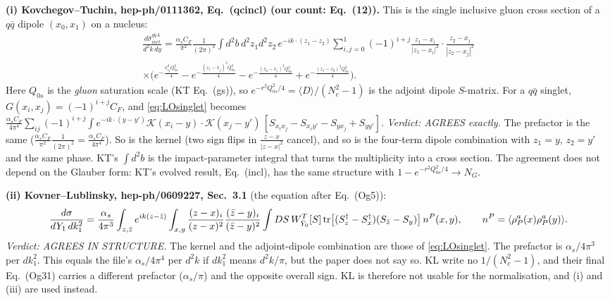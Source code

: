\medskip\noindent\textbf{(i) Kovchegov--Tuchin, hep-ph/0111362, Eq.~(qcincl) (our count: Eq.~(12)).} This is the single inclusive gluon cross section of a $q\bar q$ dipole $(x_0,x_1)$ on a nucleus:
\begin{multline*}
\frac{d\hat\sigma^{q\bar qA}_{incl}}{d^2k\,dy}=\frac{\alpha_sC_F}{\pi^2}\frac{1}{(2\pi)^2}\int d^2b\,d^2z_1d^2z_2\,e^{-ik\cdot(z_1-z_2)}\sum_{i,j=0}^{1}(-1)^{i+j}\frac{z_1-x_i}{|z_1-x_i|^2}\cdot\frac{z_2-x_j}{|z_2-x_j|^2}\\
\times\Big(e^{-\frac{x_{ij}^2Q_{0s}^2}{4}}-e^{-\frac{(z_1-x_j)^2Q_{0s}^2}{4}}-e^{-\frac{(z_2-x_i)^2Q_{0s}^2}{4}}+e^{-\frac{(z_1-z_2)^2Q_{0s}^2}{4}}\Big).
\end{multline*}
Here $Q_{0s}$ is the \emph{gluon} saturation scale (KT Eq.~(gs)), so $e^{-r^2Q_{0s}^2/4}=\langle D\rangle/(N_c^2-1)$ is the adjoint dipole $S$-matrix. For a $q\bar q$ singlet, $G(x_i,x_j)=(-1)^{i+j}C_F$, and \eqref{eq:LOsinglet} becomes
$\frac{\alpha_sC_F}{4\pi^4}\sum_{ij}(-1)^{i+j}\int e^{-ik\cdot(y-y')}\mathcal K(x_i-y)\cdot\mathcal K(x_j-y')\,[S_{x_ix_j}-S_{x_iy'}-S_{yx_j}+S_{yy'}]$.
\emph{Verdict: AGREES exactly.} The prefactor is the same ($\frac{\alpha_sC_F}{\pi^2}\frac{1}{(2\pi)^2}=\frac{\alpha_sC_F}{4\pi^4}$). So is the kernel (two sign flips in $\frac{z-x}{|z-x|^2}$ cancel), and so is the four-term dipole combination with $z_1=y$, $z_2=y'$ and the same phase. KT's $\int d^2b$ is the impact-parameter integral that turns the multiplicity into a cross section. The agreement does not depend on the Glauber form: KT's evolved result, Eq.~(incl), has the same structure with $1-e^{-r^2Q_{0s}^2/4}\to N_G$.

\medskip\noindent\textbf{(ii) Kovner--Lublinsky, hep-ph/0609227, Sec.~3.1} (the equation after Eq.~(Og5)):
\[
\frac{d\sigma}{dY_1\,dk_1^2}=\frac{\alpha_s}{4\pi^3}\int_{z,\bar z}e^{ik(z-\bar z)}\int_{x,y}\frac{(z-x)_i}{(z-x)^2}\frac{(\bar z-y)_i}{(\bar z-y)^2}\int DS\,W^T_{\bar Y_0}[S]\,{\rm tr}\big[(S_z^\dagger-S^\dagger_x)(S_{\bar z}-S_y)\big]\,n^P(x,y),\qquad n^P=\langle\rho^a_P(x)\rho^a_P(y)\rangle .
\]
\emph{Verdict: AGREES IN STRUCTURE.} The kernel and the adjoint-dipole combination are those of \eqref{eq:LOsinglet}. The prefactor is $\alpha_s/4\pi^3$ per $dk_1^2$. This equals the file's $\alpha_s/4\pi^4$ per $d^2k$ if $dk_1^2$ means $d^2k/\pi$, but the paper does not say so. KL write no $1/(N_c^2-1)$, and their final Eq.~(Og31) carries a different prefactor ($\alpha_s/\pi$) and the opposite overall sign. KL is therefore not usable for the normalisation, and (i) and (iii) are used instead.

